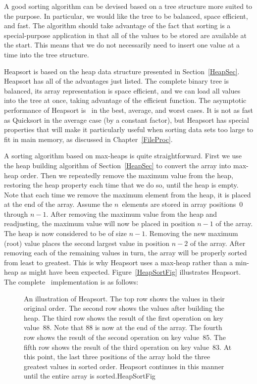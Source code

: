 A good sorting algorithm can be devised based on a tree structure more
suited to the purpose.
In particular, we would like the tree to be balanced, space efficient,
and fast.
The algorithm should take advantage of the fact that sorting is a
special-purpose application in that all of the values to be stored are
available at the start.
This means that we do not necessarily need to insert one value at a
time into the tree structure.

Heapsort is based on the heap data structure presented in
Section~\ref{HeapSec}.
Heapsort has all of the advantages just listed.
The complete binary tree
is balanced, its array representation is space efficient, and we can
load all values into the tree at once, taking advantage of the
efficient  function.
The asymptotic performance of Heapsort is \Thetanlogn\ in
the best, average, and worst cases.
It is not as fast as Quicksort in the average case (by a constant
factor), but Heapsort has special properties that will make it
particularly useful when sorting data sets too large to fit in main
memory, as discussed in
Chapter~\ref{FileProc}.

A sorting algorithm based on max-heaps is quite straightforward.
First we use the heap building algorithm of Section~\ref{HeapSec} to
convert the array into max-heap order.
Then we repeatedly remove the
maximum value from the heap, restoring the heap property each time
that we do so, until the heap is empty.
Note that each time we remove the maximum element from the heap, it is
placed at the end of the array.
Assume the \(n\)~elements are stored in array positions~0
through \(n-1\).
After removing the maximum value from the heap and
readjusting, the maximum value will now be placed in position \(n-1\)
of the array.
The heap is now considered to be of size \(n-1\).
Removing the new maximum (root) value places the second largest value
in position \(n-2\) of the array.
After removing each of the remaining values in turn, the array will be
properly sorted from least to greatest.
This is why Heapsort uses a max-heap rather than a min-heap as might
have been expected.
Figure~\ref{HeapSortFig} illustrates Heapsort.
The complete \Lang\ implementation is as follows:

\begin{figure}
\smallskip
{}
{An illustration of Heapsort.
The top row shows the values in their
original order.  The second row shows the values after building the
heap.  The third row shows the result of the first 
operation on key value~88.  Note that 88 is now at the end of the
array.  The fourth row shows the result of the second 
operation on key value~85.  The fifth row shows the result of the
third  operation on key value~83.  At this point, the
last three positions of the array hold the three greatest values in
sorted order.  Heapsort continues in this manner until the entire
array is sorted.}{HeapSortFig}
\end{figure}

